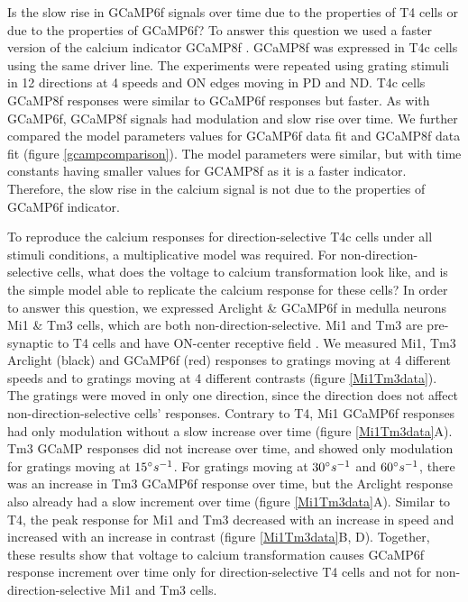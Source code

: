 \documentclass[9pt,lineno]{elife}
\begin{document}
Is the slow rise in GCaMP6f signals over time due to the properties of T4 cells or due to the properties of GCaMP6f? To answer this question we used a faster version of the calcium indicator GCaMP8f \parencite{Zhang2020}. GCaMP8f was expressed in T4c cells using the same driver line. The experiments were repeated using grating stimuli in 12 directions at 4 speeds and ON edges moving in PD and ND. T4c cells GCaMP8f responses were similar to GCaMP6f responses but faster. As with GCaMP6f, GCaMP8f signals had modulation and slow rise over time. We further compared the model parameters values for GCaMP6f data fit and GCaMP8f data fit (figure \ref{gcampcomparison}). The model parameters were similar, but with time constants having smaller values for GCAMP8f as it is a faster indicator. Therefore, the slow rise in the calcium signal is not due to the properties of GCaMP6f indicator. 

To reproduce the calcium responses for direction-selective T4c cells under all stimuli conditions, a multiplicative model was required. For non-direction-selective cells, what does the voltage to calcium transformation look like, and is the simple model able to replicate the calcium response for these cells?
In order to answer this question, we expressed Arclight \& GCaMP6f in medulla neurons Mi1 \& Tm3 cells, which are both non-direction-selective. Mi1 and Tm3 are pre-synaptic to T4 cells and have ON-center receptive field \parencite{Behnia2014, Arenz2017}. We measured Mi1, Tm3 Arclight (black) and GCaMP6f (red) responses to gratings moving at 4 different speeds and to gratings moving at 4 different contrasts (figure \ref{Mi1Tm3data}). The gratings were moved in only one direction, since the direction does not affect non-direction-selective cells' responses. Contrary to T4, Mi1 GCaMP6f responses had only modulation without a slow increase over time (figure \ref{Mi1Tm3data}A). Tm3 GCaMP responses did not increase over time, and showed only modulation for gratings moving at $15\degree s^{-1}$. For gratings moving at $30\degree s^{-1}$ and $60\degree s^{-1}$, there was an increase in Tm3 GCaMP6f response over time, but the Arclight response also already had a slow increment over time (figure \ref{Mi1Tm3data}A). Similar to T4, the peak response for Mi1 and Tm3 decreased with an increase in speed and increased with an increase in contrast (figure \ref{Mi1Tm3data}B, D). Together, these results show that voltage to calcium transformation causes GCaMP6f response increment over time only for direction-selective T4 cells and not for non-direction-selective Mi1 and Tm3 cells.
\end{document}
